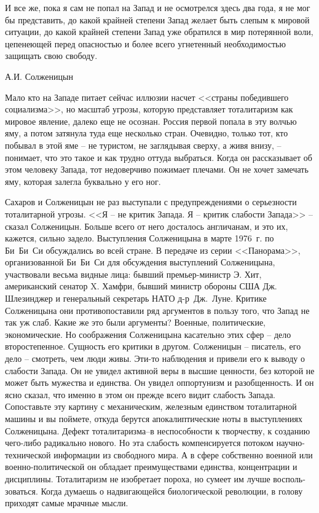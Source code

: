 \documentclass{book}
\begin{document}
\epigraph{И все же, пока я сам не попал на За­пад и не осмотрелся здесь два года, я не мог бы представить, до какой крайней степени Запад желает быть слепым к мировой ситуации, до какой крайней степени Запад уже обратился в мир потерянной воли, цепенеющей перед опасностью и более всего угнетенный необходимостью защищать свою свободу.}{А.И. Солженицын%
}


Мало кто на Западе питает сейчас иллюзии насчет <<страны победившего социализма>>, но масштаб угрозы, которую пред­ставляет тоталитаризм как мировое явление, далеко еще не осознан. Россия первой попала в эту волчью яму, а потом затянула туда еще несколько стран. Очевидно, только тот, кто побывал в этой яме -- не туристом, не заглядывая сверху, а живя внизу, -- понимает, что это такое и как трудно оттуда выбраться. Когда он рассказывает об этом человеку Запада, тот недоверчиво пожимает плечами. Он не хочет замечать яму, которая залегла буквально у его ног.

Сахаров и Солженицын не раз выступали с предупреждениями о серьезности тоталитарной угрозы. <<Я -- не критик Запада. Я -- критик слабости Запада>> -- сказал Солженицын. Больше всего от него досталось англичанам, и это их, кажется, сильно задело. Выступления Солженицына в марте 1976~г. по Би~Би~Си обсуждались во всей стране. В передаче из серии <<Панорама>>, организованной Би~Би~Си для обсуждения выступлений Солженицына, участвовали весьма видные лица: бывший премьер-министр Э. Хит, американский сенатор X. Хамфри, бывший министр обороны США Дж. Шлезинджер и генераль­ный секретарь НАТО д-р~Дж.~Луне. Критике Солженицына они противопоставили ряд аргументов в пользу того, что Запад не так уж слаб. Какие же это были аргументы? Военные, политические, экономические. Но соображения Солженицына касательно этих сфер -- дело второстепенное. Сущность его кри­тики в другом. Солженицын -- писатель, его дело -- смотреть, чем люди живы. Эти-то наблюдения и привели его к выводу о слабости Запада. Он не увидел активной веры в 
высшие цен­ности, без которой не может быть мужества и единства. Он уви­дел оппортунизм и разобщенность. И он ясно сказал, что имен­но в этом он прежде всего видит слабость Запада. Сопоставь­те эту картину с механическим, железным единством тотали­тарной машины и вы поймете, откуда берутся апокалиптические ноты в выступлениях Солженицына. Дефект тоталитариз­ма--в неспособности к творчеству, к созданию чего-либо ради­кально нового. Но эта слабость компенсируется потоком науч­но-технической информации из свободного мира. А в сфере собственно военной или военно-политической он обладает преимуществами единства, концентрации и дисциплины. То­талитаризм не изобретает пороха, но сумеет им лучше восполь­зоваться. Когда думаешь о надвигающейся биологической ре­волюции, в голову приходят самые мрачные мысли.
\end{document}

